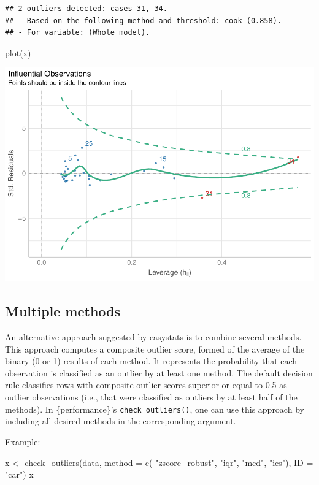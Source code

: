 \documentclass[
]{article}
\newenvironment{Shaded}{\begin{snugshade}}{\end{snugshade}}
\newcommand{\AttributeTok}[1]{\textcolor[rgb]{0.77,0.63,0.00}{#1}}
\newcommand{\FunctionTok}[1]{\textcolor[rgb]{0.00,0.00,0.00}{#1}}
\newcommand{\NormalTok}[1]{#1}
\newcommand{\OtherTok}[1]{\textcolor[rgb]{0.56,0.35,0.01}{#1}}
\newcommand{\StringTok}[1]{\textcolor[rgb]{0.31,0.60,0.02}{#1}}
\begin{document}
\begin{verbatim}
## 2 outliers detected: cases 31, 34.
## - Based on the following method and threshold: cook (0.858).
## - For variable: (Whole model).
\end{verbatim}

\begin{Shaded}
\begin{Highlighting}[]
\FunctionTok{plot}\NormalTok{(x)}
\end{Highlighting}
\end{Shaded}

\includegraphics{paper_files/figure-latex/model-based outliers-1.pdf}

\hypertarget{multiple-methods}{%
\subsection{Multiple methods}\label{multiple-methods}}

An alternative approach suggested by easystats is to combine several
methods. This approach computes a composite outlier score, formed of the
average of the binary (0 or 1) results of each method. It represents the
probability that each observation is classified as an outlier by at
least one method. The default decision rule classifies rows with
composite outlier scores superior or equal to 0.5 as outlier
observations (i.e., that were classified as outliers by at least half of
the methods). In \{performance\}'s \texttt{check\_outliers()}, one can
use this approach by including all desired methods in the corresponding
argument.

Example:

\begin{Shaded}
\begin{Highlighting}[]
\NormalTok{x }\OtherTok{\textless{}{-}} \FunctionTok{check\_outliers}\NormalTok{(data, }\AttributeTok{method =} \FunctionTok{c}\NormalTok{(}
  \StringTok{"zscore\_robust"}\NormalTok{, }\StringTok{"iqr"}\NormalTok{, }\StringTok{"mcd"}\NormalTok{, }\StringTok{"ics"}\NormalTok{), }\AttributeTok{ID =} \StringTok{"car"}\NormalTok{)}
\NormalTok{x}
\end{Highlighting}
\end{Shaded}
\end{document}
